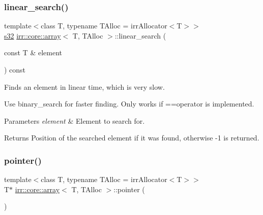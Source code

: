 \subsubsection{\texorpdfstring{linear\+\_\+search()}{linear\_search()}\hspace{0.1cm}{\footnotesize\ttfamily [2/2]}}
{\footnotesize\ttfamily template$<$class T, typename T\+Alloc = irr\+Allocator$<$\+T$>$$>$ \\
\hyperlink{namespaceirr_ac66849b7a6ed16e30ebede579f9b47c6}{s32} \hyperlink{classirr_1_1core_1_1array}{irr\+::core\+::array}$<$ T, T\+Alloc $>$\+::linear\+\_\+search (\begin{DoxyParamCaption}\item[{const T \&}]{element }\end{DoxyParamCaption}) const\hspace{0.3cm}{\ttfamily [inline]}}



Finds an element in linear time, which is very slow. 

Use binary\+\_\+search for faster finding. Only works if ==operator is implemented. 
\begin{DoxyParams}{Parameters}
{\em element} & Element to search for. \\
\hline
\end{DoxyParams}
\begin{DoxyReturn}{Returns}
Position of the searched element if it was found, otherwise -\/1 is returned. 
\end{DoxyReturn}
\mbox{\label{classirr_1_1core_1_1array_a7b29797486e1c2ab3e7821082dab998c}} 
\subsubsection{\texorpdfstring{pointer()}{pointer()}\hspace{0.1cm}{\footnotesize\ttfamily [1/2]}}
{\footnotesize\ttfamily template$<$class T, typename T\+Alloc = irr\+Allocator$<$\+T$>$$>$ \\
T$\ast$ \hyperlink{classirr_1_1core_1_1array}{irr\+::core\+::array}$<$ T, T\+Alloc $>$\+::pointer (\begin{DoxyParamCaption}{ }\end{DoxyParamCaption})\hspace{0.3cm}{\ttfamily [inline]}}



